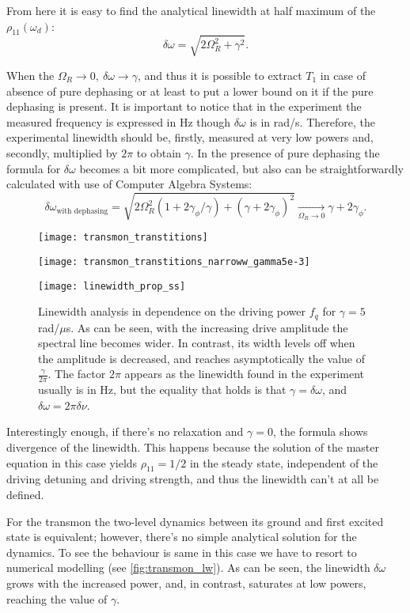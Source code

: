 \documentclass[12pt, twoside]{report}
\numberwithin{equation}{section}
\begin{document}
From here it is easy to find the analytical linewidth at half maximum of the $\rho_{11}(\omega_d)$:
\[
\delta\omega = \sqrt{2\Omega_R^2+\gamma^2}.
\]

When the $\Omega_R \rightarrow 0,\ \delta\omega\rightarrow\gamma$, and thus it is possible to extract $T_1$ in case of absence of pure dephasing or at least to put a lower bound on it if the pure dephasing is present. It is important to notice that in the experiment the measured frequency is expressed in Hz though $\delta\omega$ is in rad/s. Therefore, the experimental linewidth should be, firstly, measured at very low powers and, secondly, multiplied by $2\pi$ to obtain $\gamma$. In the presence of pure dephasing the formula for $\delta\omega$ becomes a bit more complicated, but also can be straightforwardly calculated with use of Computer Algebra Systems:
\[
\delta\omega_{\text{with dephasing}} = \sqrt{2Ω_{R}^{2} (1+2 γ_{ϕ}/\gamma) + (\gamma +2\gamma_\phi)^2} \xrightarrow[\Omega_R\rightarrow 0]{} γ + 2γ_{ϕ}.
\]


\begin{figure}[h!]
\centering
\texttt{[image: transmon\_transtitions]}

\texttt{[image: transmon\_transtitions\_narroww\_gamma5e-3]}

\texttt{[image: linewidth\_prop\_ss]}

\caption{Linewidth analysis in dependence on the driving power $f_q$ for $\gamma = 5$ rad/$\mu$s. As can be seen, with the increasing drive amplitude the spectral line becomes wider. In contrast, its width levels off when the amplitude is decreased, and reaches asymptotically the value of $\frac{\gamma}{2\pi}$. The factor $2\pi$ appears as the linewidth found in the experiment usually is in Hz, but the equality that holds is that $\gamma = \delta\omega$, and $\delta\omega = 2\pi\delta\nu$.}
\label{fig:transmon_lw}
\end{figure}  

Interestingly enough, if there's no relaxation and $\gamma = 0$, the formula shows divergence of the linewidth. This happens because the solution of the master equation in this case yields $\rho_{11} = 1/2$ in the steady state, independent of the driving detuning and driving strength, and thus the linewidth can't at all be defined.

For the transmon the two-level dynamics between its ground and first excited state is equivalent; however, there's no simple analytical solution for the dynamics. To see the behaviour is same in this case we have to resort to numerical modelling (see \autoref{fig:transmon_lw}).
As can be seen, the linewidth $\delta\omega$ grows with the increased power, and, in contrast, saturates at low powers, reaching the value of $\gamma$.

%

%

\appendix

%




\end{document}
